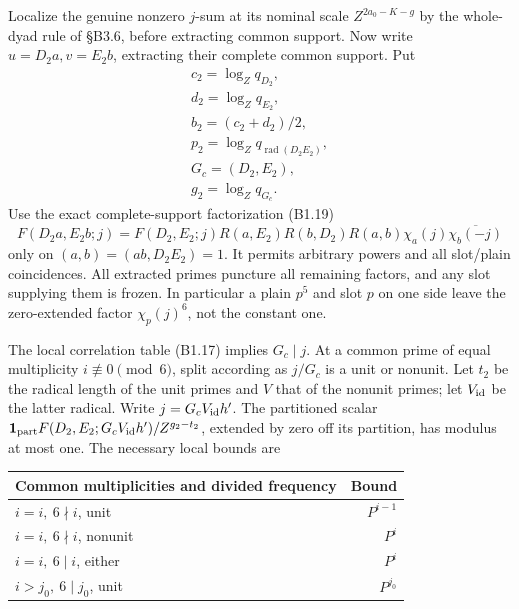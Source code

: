 \documentclass[11pt,a4paper]{article}
\begin{document}
Localize the genuine nonzero \(j\)-sum at its nominal scale
\(Z^{2a_0-K-g}\) by the whole-dyad rule of §B3.6, before extracting
common support. Now write \(u=D_2a,\allowbreak{}v=E_2b\), extracting their complete
common support. Put \[
\begin{gathered}
c_2=\log_Zq_{D_2},\\ d_2=\log_Zq_{E_2},\\ b_2=(c_2+d_2)/2,
\\ p_2=\log_Zq_{\operatorname{rad}(D_2E_2)},\\ G_c=(D_2,E_2),\\ g_2=\log_Zq_{G_c}.
\end{gathered}
\] Use the exact complete-support factorization (B1.19) \[
F(D_2a,E_2b;j)=F(D_2,E_2;j)R(a,E_2)R(b,D_2)R(a,b)
 \chi_a(j)\overline{\chi_b(-j)}
\tag{B3.62}
\] only on \((a,\allowbreak{}b)=(ab,\allowbreak{}D_2E_2)=1\). It permits arbitrary powers and all
slot/plain coincidences. All extracted primes puncture all remaining
factors, and any slot supplying them is frozen. In particular a plain
\(p^5\) and slot \(p\) on one side leave the zero-extended factor
\(\chi_p(j)^6\), not the constant one.

The local correlation table (B1.17) implies \(G_c\mid j\). At a common
prime of equal multiplicity \(i\not\equiv0\pmod6\), split according as
\(j/G_c\) is a unit or nonunit. Let \(t_2\) be the radical length of the
unit primes and \(V\) that of the nonunit primes; let \(V_{\rm id}\) be
the latter radical. Write \(j=G_cV_{\rm id}h'\). The partitioned scalar
\(\mathbf1_{\rm part}F(D_2,\allowbreak{}E_2;G_cV_{\rm id}h')/Z^{g_2-t_2}\), extended
by zero off its partition, has modulus at most one. The necessary local
bounds are

\begin{longtable}[]{@{}lr@{}}
\toprule\noalign{}
Common multiplicities and divided frequency & Bound \\
\midrule\noalign{}
\endhead
\bottomrule\noalign{}
\endlastfoot
\(i=i,\allowbreak{}\ 6\nmid i\), unit & \(P^{i-1}\) \\
\(i=i,\allowbreak{}\ 6\nmid i\), nonunit & \(P^i\) \\
\(i=i,\allowbreak{}\ 6\mid i\), either & \(P^i\) \\
\(i>j_0,\allowbreak{}\ 6\mid j_0\), unit & \(P^{j_0}\) \\
\end{longtable}
\end{document}
